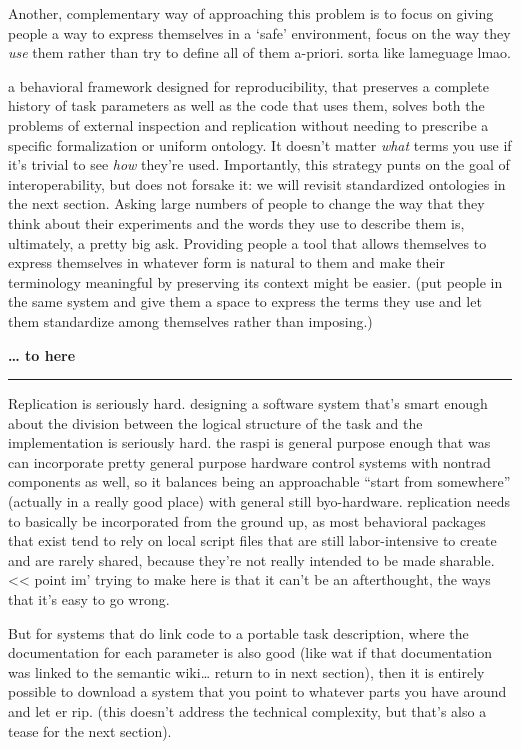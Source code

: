 \documentclass[11pt]{article}
\begin{document}
\begin{multicols}{2}
Another, complementary way of approaching this problem is to focus on
giving people a way to express themselves in a `safe' environment, focus
on the way they \emph{use} them rather than try to define all of them
a-priori. sorta like lameguage lmao.

a behavioral framework designed for reproducibility, that preserves a
complete history of task parameters as well as the code that uses them,
solves both the problems of external inspection and replication without
needing to prescribe a specific formalization or uniform ontology. It
doesn't matter \emph{what} terms you use if it's trivial to see
\emph{how} they're used. Importantly, this strategy punts on the goal of
interoperability, but does not forsake it: we will revisit standardized
ontologies in the next section. Asking large numbers of people to change
the way that they think about their experiments and the words they use
to describe them is, ultimately, a pretty big ask. Providing people a
tool that allows themselves to express themselves in whatever form is
natural to them and make their terminology meaningful by preserving its
context might be easier. (put people in the same system and give them a
space to express the terms they use and let them standardize among
themselves rather than imposing.)

\textbf{\ldots{} to here}

\begin{center}\rule{0.5\linewidth}{0.5pt}\end{center}

Replication is seriously hard. designing a software system that's smart
enough about the division between the logical structure of the task and
the implementation is seriously hard. the raspi is general purpose
enough that was can incorporate pretty general purpose hardware control
systems with nontrad components as well, so it balances being an
approachable ``start from somewhere'' (actually in a really good place)
with general still byo-hardware. replication needs to basically be
incorporated from the ground up, as most behavioral packages that exist
tend to rely on local script files that are still labor-intensive to
create and are rarely shared, because they're not really intended to be
made sharable. \textless\textless{} point im' trying to make here is
that it can't be an afterthought, the ways that it's easy to go wrong.

But for systems that do link code to a portable task description, where
the documentation for each parameter is also good (like wat if that
documentation was linked to the semantic wiki\ldots{} return to in next
section), then it is entirely possible to download a system that you
point to whatever parts you have around and let er rip. (this doesn't
address the technical complexity, but that's also a tease for the next
section).


\end{multicols}
\end{document}
